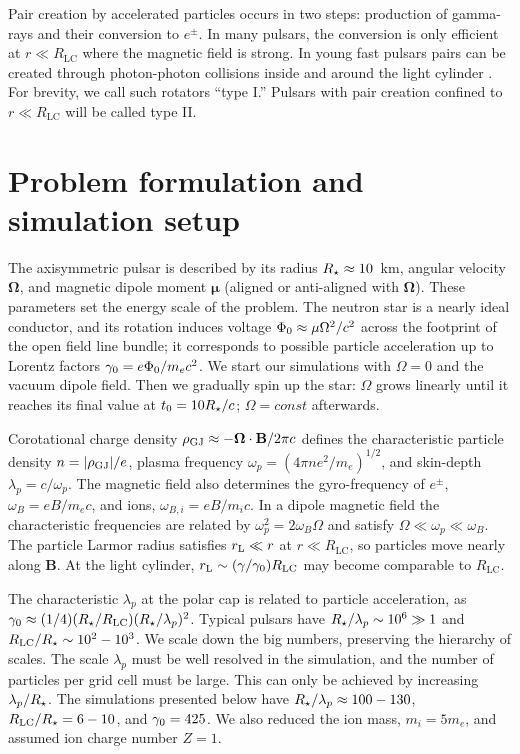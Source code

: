 Pair creation by accelerated particles occurs in two steps: production of gamma-rays
and their conversion to $e^\pm$. In many pulsars, the conversion is only efficient
at $r\ll R_\mathrm{LC}$ where the magnetic field is strong. In young fast pulsars pairs can
be created through photon-photon collisions inside and around
the light cylinder
\citep{cheng_energetic_1986}.
For brevity, we call such rotators
``type I.'' Pulsars with pair creation confined to $r\ll R_\mathrm{LC}$ will be called type II.


\section{Problem formulation and simulation setup}


The axisymmetric pulsar is described by its radius $R_{\star}\approx 10$~km,
angular velocity $\boldsymbol{\Omega}$, and magnetic dipole moment $\boldsymbol{\mu}$ (aligned or
anti-aligned with $\boldsymbol{\Omega}$).  These parameters set the energy scale of
the problem. The neutron star is a nearly ideal conductor, and its
rotation induces voltage $\Phi_0\approx \mu\Omega^2/c^2$ across the
footprint of the open field line bundle;
it corresponds to possible particle acceleration up to Lorentz factors
$\gamma_0=e\Phi_0/m_ec^2$.
We start our simulations with $\Omega=0$ and the vacuum dipole field.
Then we gradually spin up the star: $\Omega$ grows linearly until
it reaches its final value at $t_0=10 R_{\star}/c$;
$\Omega=const$ afterwards.

Corotational charge density
$\rho_{\rm GJ}\approx -\boldsymbol{\Omega}\cdot \mathbf{B}/2\pi c$
defines the characteristic particle density $n=|\rho_{\rm GJ}|/e$, plasma
frequency $\omega_p=(4\pi ne^2/m_e)^{1/2}$, and skin-depth
$\lambda_p=c/\omega_p$.  The magnetic field also determines the
gyro-frequency of $e^\pm$, $\omega_B=eB/m_ec$, and ions,
$\omega_{B,i}=eB/m_ic$. In a dipole magnetic field
the characteristic frequencies
are related by $\omega_p^2=2\omega_B\Omega$ and satisfy
$\Omega\ll\omega_p\ll\omega_B$.
The particle Larmor radius satisfies
$r_{\rm L}\ll r$ at $r\ll R_\mathrm{LC}$, so particles move nearly along $\mathbf{B}$. At the light cylinder,
$r_{\rm L}\sim(\gamma/\gamma_0)R_\mathrm{LC}$ may become comparable to $R_\mathrm{LC}$.

The characteristic $\lambda_p$ at the polar cap is related to particle
acceleration, as $\gamma_0\approx (1/4)(R_{\star}/R_\mathrm{LC})(R_{\star}/\lambda_p)^2$.
Typical pulsars have $R_{\star}/\lambda_p\sim 10^6\gg 1$ and $R_\mathrm{LC}/R_{\star}\sim
10^2-10^3$.  We scale down the big numbers, preserving the hierarchy
of scales. The scale $\lambda_p$ must be well resolved in the
simulation, and the number of particles per grid cell must be large.
This can only be achieved by increasing $\lambda_p/R_{\star}$.
The simulations presented below have
$R_{\star}/\lambda_p\approx 100-130$, $R_\mathrm{LC}/R_{\star}=6-10$, and  $\gamma_0=425$.
We also reduced the ion mass, $m_i=5m_e$,
and assumed ion charge number $Z=1$.

